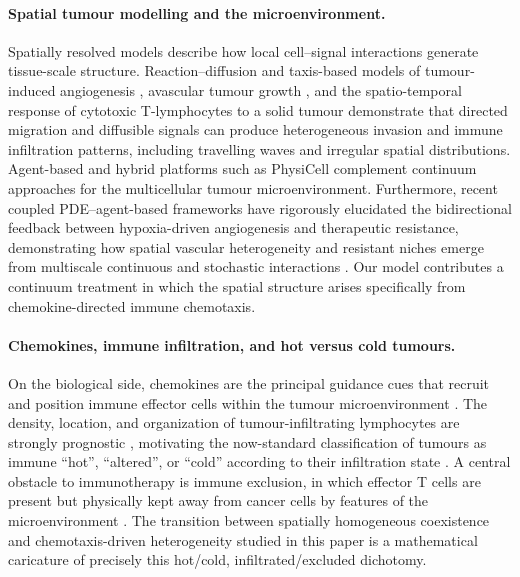 \documentclass[a4paper,fleqn,longmktitle]{cas-sc}
\theoremstyle{plain}
\theoremstyle{definition}
\numberwithin{equation}{section}
\begin{document}
\paragraph{Spatial tumour modelling and the microenvironment.}
Spatially resolved models describe how local cell--signal interactions generate
tissue-scale structure. Reaction--diffusion and taxis-based models of
tumour-induced angiogenesis \cite{yu2026rigorous,hadjigeorgiou2024hybrid,anderson1998continuous,agosti2023image}, avascular tumour growth
\cite{wang2026breakdown,roose2007mathematical,ferreira2002reaction,chaplain1996avascular}, and the spatio-temporal response of cytotoxic T-lymphocytes to
a solid tumour \cite{matzavinos2004mathematical} demonstrate that directed
migration and diffusible signals can produce heterogeneous invasion and immune
infiltration patterns, including travelling waves and irregular spatial
distributions. Agent-based and hybrid platforms such as PhysiCell
\cite{ghaffarizadeh2018physicell,wang2025multi,savic2022heterogeneous} complement continuum approaches for the multicellular
tumour microenvironment. Furthermore, recent coupled PDE--agent-based frameworks have rigorously elucidated the bidirectional feedback between hypoxia-driven angiogenesis and therapeutic resistance, demonstrating how spatial vascular heterogeneity and resistant niches emerge from multiscale continuous and stochastic interactions \cite{wang2025analysis1}. Our model contributes a continuum treatment in which the
spatial structure arises specifically from chemokine-directed immune chemotaxis.

\paragraph{Chemokines, immune infiltration, and hot versus cold tumours.}
On the biological side, chemokines are the principal guidance cues that recruit
and position immune effector cells within the tumour microenvironment
\cite{nagarsheth2017chemokines,chaudhary2025role,liang2025global,foeng2022harnessing}. The density, location, and organization of tumour-infiltrating
lymphocytes are strongly prognostic \cite{galon2006type,lopez2025biological,yu2026pattern,brummel2023tumour}, motivating the now-standard
classification of tumours as immune ``hot'', ``altered'', or ``cold'' according
to their infiltration state \cite{galon2019approaches}. A central obstacle to
immunotherapy is immune exclusion, in which effector T cells are present but
physically kept away from cancer cells by features of the microenvironment
\cite{joyce2015t,yu2024extracellular,wang2026algebraic,bruni2023cancer}. The transition between spatially homogeneous coexistence
and chemotaxis-driven heterogeneity studied in this paper is a mathematical
caricature of precisely this hot/cold, infiltrated/excluded dichotomy.
\end{document}
